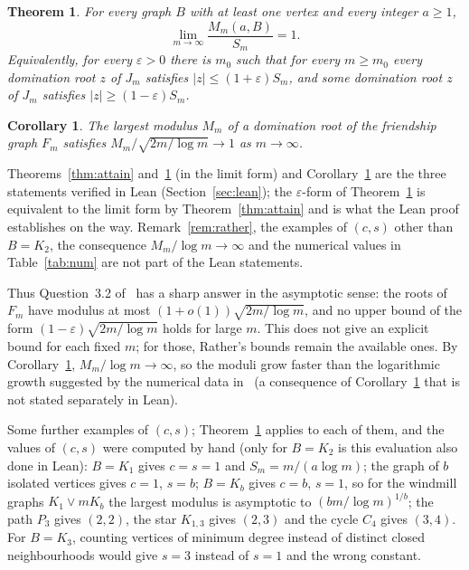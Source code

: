 \documentclass[11pt]{article}
\newtheorem{theorem}{Theorem}
\newtheorem{corollary}{Corollary}
\theoremstyle{definition}
\theoremstyle{remark}
\begin{document}
\begin{theorem}\label{thm:main}
For every graph $B$ with at least one vertex and every integer $a\ge1$,
\[
\lim_{m\to\infty}\frac{M_m(a,B)}{S_m}=1 .
\]
Equivalently, for every $\varepsilon>0$ there is $m_0$ such that for every
$m\ge m_0$ every domination root $z$ of $J_m$ satisfies
$|z|\le(1+\varepsilon)S_m$, and some domination root $z$ of $J_m$ satisfies
$|z|\ge(1-\varepsilon)S_m$.
\end{theorem}

\begin{corollary}\label{cor:friend}
The largest modulus $M_m$ of a domination root of the friendship graph $F_m$
satisfies $M_m/\sqrt{2m/\log m}\to1$ as $m\to\infty$.
\end{corollary}

\noindent Theorems~\ref{thm:attain} and~\ref{thm:main} (in the limit form)
and Corollary~\ref{cor:friend} are the three statements verified in Lean
(Section~\ref{sec:lean}); the $\varepsilon$-form of Theorem~\ref{thm:main} is
equivalent to the limit form by Theorem~\ref{thm:attain} and is what the Lean
proof establishes on the way. Remark~\ref{rem:rather}, the examples of
$(c,s)$ other than $B=K_2$, the consequence $M_m/\log m\to\infty$ and the
numerical values in Table~\ref{tab:num} are not part of the Lean statements.

Thus Question~3.2 of~\cite{abj} has a sharp answer in the asymptotic sense:
the roots of $F_m$ have modulus at most $(1+o(1))\sqrt{2m/\log m}$, and no
upper bound of the form $(1-\varepsilon)\sqrt{2m/\log m}$ holds for large $m$.
This does not give an explicit bound for each fixed $m$; for those, Rather's
bounds remain the available ones. By Corollary~\ref{cor:friend},
$M_m/\log m\to\infty$, so the
moduli grow faster than the logarithmic growth suggested by the numerical
data in~\cite{abj} (a consequence of Corollary~\ref{cor:friend} that is not
stated separately in Lean).

Some further examples of $(c,s)$; Theorem~\ref{thm:main} applies to each of
them, and the values of $(c,s)$ were computed by hand (only for $B=K_2$ is
this evaluation also done in Lean): $B=K_1$ gives $c=s=1$ and $S_m=m/(a\log m)$; the graph of $b$
isolated vertices gives $c=1$, $s=b$; $B=K_b$ gives $c=b$, $s=1$, so for the
windmill graphs $K_1\vee mK_b$ the largest modulus is asymptotic to
$(bm/\log m)^{1/b}$; the path $P_3$ gives $(2,2)$, the star $K_{1,3}$ gives
$(2,3)$ and the cycle $C_4$ gives $(3,4)$. For $B=K_3$, counting vertices of
minimum degree instead of distinct closed neighbourhoods would give $s=3$
instead of $s=1$ and the wrong constant.
\end{document}
